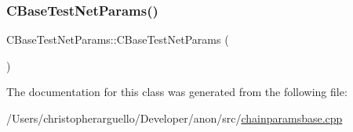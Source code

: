 \subsubsection{\texorpdfstring{C\+Base\+Test\+Net\+Params()}{CBaseTestNetParams()}}
{\footnotesize\ttfamily C\+Base\+Test\+Net\+Params\+::\+C\+Base\+Test\+Net\+Params (\begin{DoxyParamCaption}{ }\end{DoxyParamCaption})\hspace{0.3cm}{\ttfamily [inline]}}



The documentation for this class was generated from the following file\+:\begin{DoxyCompactItemize}
\item 
/\+Users/christopherarguello/\+Developer/anon/src/\mbox{\hyperlink{chainparamsbase_8cpp}{chainparamsbase.\+cpp}}\end{DoxyCompactItemize}
